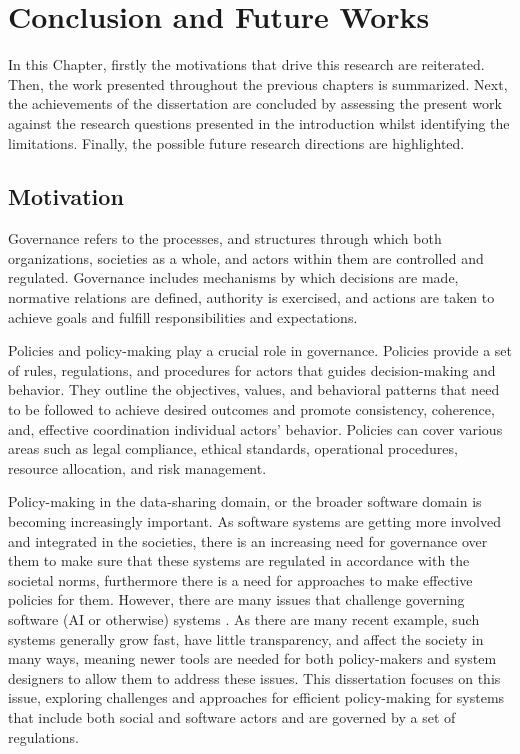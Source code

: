 \chapter{Conclusion and Future Works}


In this Chapter, firstly the motivations that drive this research are reiterated. Then, the work presented throughout the previous chapters is summarized. Next, the achievements of the dissertation are concluded by assessing the present work against the research questions presented in the introduction whilst identifying the limitations. Finally, the possible future research directions are highlighted.

\section{Motivation}
Governance refers to the processes, and structures through which both organizations, societies as a whole, and actors within them are controlled and regulated. Governance includes mechanisms by which decisions are made, normative relations are defined, authority is exercised, and actions are taken to achieve goals and fulfill responsibilities and expectations.

Policies and policy-making play a crucial role in governance. Policies provide a set of rules, regulations, and procedures for actors that guides decision-making and behavior. They outline the objectives, values, and behavioral patterns that need to be followed to achieve desired outcomes and promote consistency, coherence, and, effective coordination individual actors' behavior. Policies can cover various areas such as legal compliance, ethical standards, operational procedures, resource allocation, and risk management.

Policy-making in the data-sharing domain, or the broader software domain is becoming increasingly important. As software systems are getting more involved and integrated in the societies, there is an increasing need for governance over them to make sure that these systems are regulated in accordance with the societal norms,  furthermore there is a need for approaches to make effective policies for them. However, there are many issues that challenge governing software (AI or otherwise) systems \cite{}. As there are many recent example, such systems generally grow fast, have little transparency, and affect the society in many ways, meaning newer tools are needed for both policy-makers and system designers to allow them to address these issues. This dissertation focuses on this issue, exploring challenges and approaches for efficient policy-making for systems that include both social and software actors and are governed by a set of regulations.

